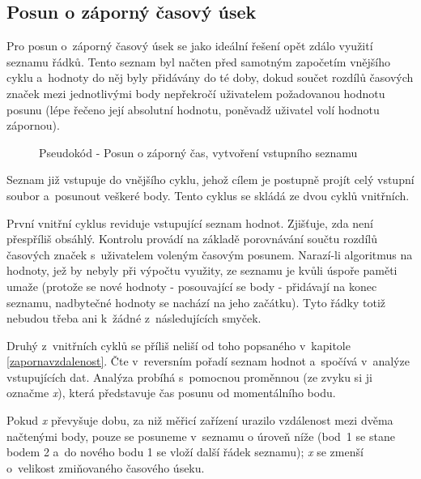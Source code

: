 \subsection{Posun o záporný časový úsek}
\label{zapornycas}

Pro posun o~záporný časový úsek se jako ideální řešení opět zdálo využití seznamu řádků.
Tento seznam byl načten před samotným započetím vnějšího cyklu a~hodnoty do něj byly
přidávány do té doby, dokud součet rozdílů časových značek mezi jednotlivými body
nepřekročí uživatelem požadovanou hodnotu posunu (lépe řečeno její absolutní hodnotu,
poněvadž uživatel volí hodnotu zápornou). 

    \begin{figure}[h]
    \centering
    \begin{algorithmic}[1]
    \ENDWHILE
    \end{algorithmic}
    \caption{Pseudokód - Posun o záporný čas, vytvoření vstupního seznamu}
    \label{fig:pseudozapornycas-vstup}
    \end{figure}

Seznam již vstupuje do vnějšího cyklu, jehož cílem je postupně projít celý vstupní
soubor a~posunout veškeré body. Tento cyklus se skládá ze dvou cyklů vnitřních. 

První vnitřní cyklus reviduje vstupující seznam hodnot. Zjišťuje, zda není přes\-příliš obsáhlý.
Kontrolu provádí na základě porovnávání součtu rozdílů časových značek s~uživatelem
voleným časovým posunem. Narazí-li algoritmus na hodnoty, jež by nebyly při výpočtu využity,
ze seznamu je kvůli úspoře paměti umaže (protože se nové hodnoty - posouvající se body - přidávají
na konec seznamu, nadbytečné hodnoty se nachází na jeho začátku). Tyto řádky totiž nebudou
třeba ani k~žádné z~následujících smyček. 

Druhý z~vnitřních cyklů se příliš neliší od toho popsaného v~kapitole \ref{zapornavzdalenost}.
Čte v~reversním pořadí seznam hodnot a~spočívá v~analýze vstupujících dat. Analýza
probíhá s~pomocnou proměnnou (ze zvyku si ji označme
\textit{x}), která představuje čas posunu od momentálního bodu. 

Pokud \textit{x} převyšuje dobu, za niž měřicí zařízení urazilo vzdálenost mezi dvěma načtenými
body, pouze se posuneme v~seznamu o úroveň níže (bod~1 se stane bodem 2 a~do nového
bodu 1 se vloží další řádek seznamu); \textit{x} se zmenší o~velikost zmiňovaného časového úseku. 

